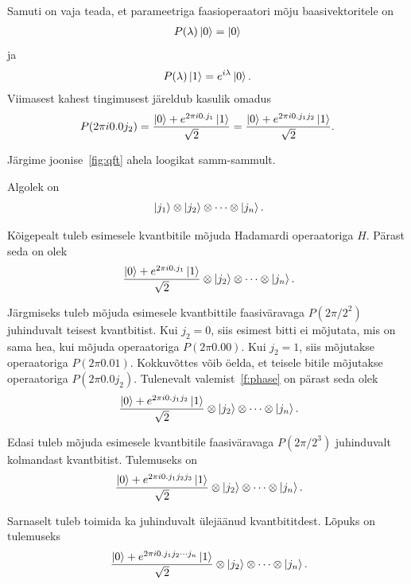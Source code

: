 \documentclass[12pt]{report}
\def\ket#1{\mathinner{|#1\rangle}}
\begin{document}
Samuti on vaja teada, et parameetriga faasioperaatori mõju baasivektoritele on
\begin{align}
    P(\lambda)\ket{0} = \ket{0}
\end{align}
ja
\begin{align}
    P(\lambda)\ket{1} = e^{i\lambda}\ket{0} .
\end{align}
Viimasest kahest tingimusest järeldub kasulik omadus
\begin{align}\label{f:phase}
    P(2\pi i0.0j_2) = \frac{\ket{0} + e^{2\pi i 0.j_1} \ket{1}}{\sqrt{2}}
    = \frac{\ket{0}+e^{2\pi i0.j_1j_2}\ket{1}}{\sqrt{2}} .
\end{align}

Järgime joonise~\ref{fig:qft} ahela loogikat samm-sammult.

Algolek on
\begin{align}
    \ket{j_1} \otimes \ket{j_2} \otimes \cdots \otimes \ket{j_n} \rlap{.}
\end{align}

Kõigepealt tuleb esimesele kvantbitile mõjuda Hadamardi operaatoriga \(H\).
Pärast seda on olek
\begin{align}
    \frac{\ket{0} + e^{2\pi i0.j_1}\ket{1}}{\sqrt{2}} \otimes \ket{j_2} \otimes \cdots \otimes \ket{j_n} \rlap{.}
\end{align}

Järgmiseks tuleb mõjuda esimesele kvantbittile faasiväravaga \(P(2\pi/2^2)\) juhinduvalt teisest kvantbitist.
Kui \(j_2 = 0\), siis esimest bitti ei mõjutata, mis on sama hea, kui mõjuda operaatoriga \(P(2\pi 0.00)\).
Kui \(j_2 = 1\), siis mõjutakse operaatoriga \(P(2\pi 0.01)\).
Kokkuvõttes võib öelda, et teisele bitile mõjutakse operaatoriga \(P(2\pi 0.0j_2)\).
Tulenevalt valemist~\ref{f:phase} on pärast seda olek
\begin{align}
    \frac{\ket{0} + e^{2\pi i0.j_1j_2}\ket{1}}{\sqrt{2}} \otimes \ket{j_2} \otimes \cdots \otimes \ket{j_n} \rlap{.}
\end{align}

Edasi tuleb mõjuda esimesele kvantbitile faasiväravaga \(P(2\pi/2^3)\) juhinduvalt kolmandast kvantbitist.
Tulemuseks on
\begin{align}
    \frac{\ket{0} + e^{2\pi i0.j_1j_2j_3}\ket{1}}{\sqrt{2}} \otimes \ket{j_2} \otimes \cdots \otimes \ket{j_n} \rlap{.}
\end{align}

Sarnaselt tuleb toimida ka juhinduvalt ülejäänud kvantbititdest.
Lõpuks on tulemuseks
\begin{align}
    \frac{\ket{0} + e^{2\pi i0.j_1j_2\cdots j_n}\ket{1}}{\sqrt{2}} \otimes \ket{j_2} \otimes \cdots \otimes \ket{j_n} \rlap{.}
\end{align}
\end{document}
